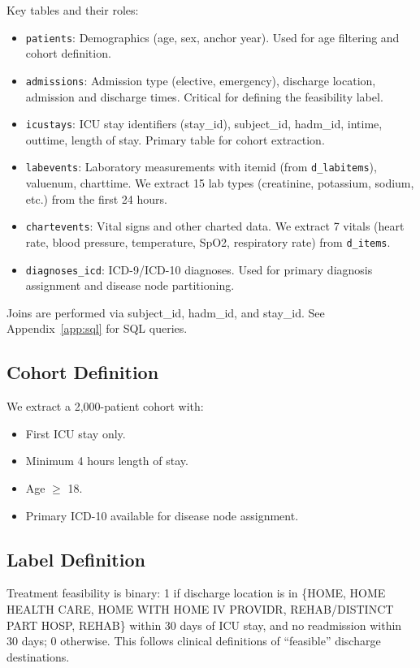 Key tables and their roles:
\begin{itemize}
\item \texttt{patients}: Demographics (age, sex, anchor year). Used for age filtering and cohort definition.
\item \texttt{admissions}: Admission type (elective, emergency), discharge location, admission and discharge times. Critical for defining the feasibility label.
\item \texttt{icustays}: ICU stay identifiers (stay\_id), subject\_id, hadm\_id, intime, outtime, length of stay. Primary table for cohort extraction.
\item \texttt{labevents}: Laboratory measurements with itemid (from \texttt{d\_labitems}), valuenum, charttime. We extract 15 lab types (creatinine, potassium, sodium, etc.) from the first 24 hours.
\item \texttt{chartevents}: Vital signs and other charted data. We extract 7 vitals (heart rate, blood pressure, temperature, SpO2, respiratory rate) from \texttt{d\_items}.
\item \texttt{diagnoses\_icd}: ICD-9/ICD-10 diagnoses. Used for primary diagnosis assignment and disease node partitioning.
\end{itemize}
Joins are performed via subject\_id, hadm\_id, and stay\_id. See Appendix~\ref{app:sql} for SQL queries.

\subsection{Cohort Definition}

We extract a 2,000-patient cohort with:
\begin{itemize}
\item First ICU stay only.
\item Minimum 4 hours length of stay.
\item Age $\geq$ 18.
\item Primary ICD-10 available for disease node assignment.
\end{itemize}

\subsection{Label Definition}

Treatment feasibility is binary: 1 if discharge location is in \{HOME, HOME HEALTH CARE, HOME WITH HOME IV PROVIDR, REHAB/DISTINCT PART HOSP, REHAB\} within 30 days of ICU stay, and no readmission within 30 days; 0 otherwise. This follows clinical definitions of ``feasible'' discharge destinations.


